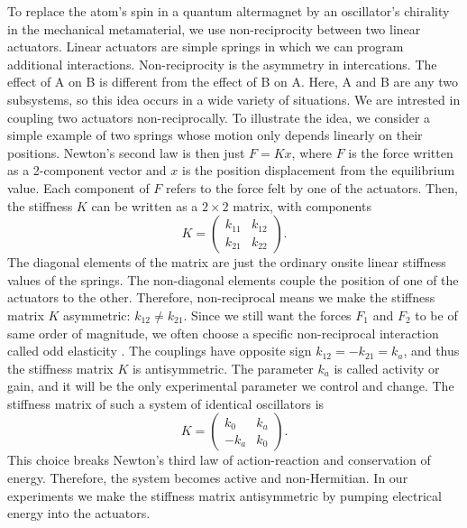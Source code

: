 \documentclass[11pt, a4paper]{article} %
\begin{document}
To replace the atom's spin in a quantum altermagnet by an oscillator's chirality in the mechanical metamaterial, 
we use non-reciprocity between two linear actuators.
Linear actuators are simple springs in which we can program additional interactions.
Non-reciprocity is the asymmetry in intercations.
The effect of A on B is different from the effect of B on A. Here, A and B are any two subsystems, so
this idea occurs in a wide variety of situations. We are intrested in coupling two actuators non-reciprocally. 
To illustrate the idea, we consider a simple example of two springs whose motion only depends linearly on their 
positions. Newton's second law is then just $F=Kx$, where $F$ is the force written as a 2-component vector and $x$ is the position displacement 
from the equilibrium value. Each component of $F$ refers to the force felt by one of the actuators. Then, the stiffness $K$ can be 
written as a $2\times 2$ matrix, with components
\begin{equation}
    K = 
\begin{pmatrix}
k_{11}& k_{12} \\ k_{21} & k_{22}
\end{pmatrix}.
\end{equation}
The diagonal elements of the matrix are just the ordinary onsite linear stiffness values of the springs. 
The non-diagonal elements couple the position 
of one of the actuators to the other. Therefore, non-reciprocal means we make the stiffness matrix $K$ asymmetric: $k_{12}\neq{k_{21}}$.
Since we still want the forces $F_1$ and $F_2$ to be of same order of magnitude, we often choose
a specific non-reciprocal interaction called odd elasticity \cite{vitelli2020odd}. The couplings have opposite sign 
$k_{12}=-{k_{21}}=k_a$, and thus the stiffness matrix $K$ is antisymmetric.
The parameter $k_a$ is called activity or gain, and it will be the only experimental parameter we control and change. 
The stiffness matrix of such a system of identical oscillators is 
\begin{equation}
     K = 
    \begin{pmatrix}
k_0 & k_a \\ -k_a & k_0
\end{pmatrix}.
\end{equation}
This choice breaks Newton's third law of action-reaction and conservation of energy.
Therefore, the system becomes active and non-Hermitian. 
In our experiments we make the stiffness matrix antisymmetric by pumping 
electrical energy into the actuators. 
\end{document}
